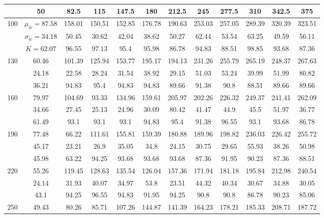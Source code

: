 \documentclass[10pt]{article}
\begin{document}
\begin{center}
\begin{tabular}{|c|c|c|c|c|c|c|c|c|c|c|c|}
\hline
 & 50 & 82.5 & 115 & 147.5 & 180 & 212.5 & 245 & 277.5 & 310 & 342.5 & 375 \\
\hline
\multirow{3}{*}{100} & $\mu_{w}=87.58$ & 158.01 & 150.51 & 152.85 & 176.78 & 190.63 & 253.03 & 257.05 & 289.39 & 320.39 & 323.51 \\
\hline
 & $\sigma_{w}=34.18$ & 50.45 & 30.62 & 42.04 & 38.62 & 50.27 & 62.44 & 53.54 & 63.25 & 49.59 & 56.11 \\
\hline
 & $K=62.07$ & 96.55 & 97.13 & 95.4 & 95.98 & 86.78 & 94.83 & 88.51 & 98.85 & 93.68 & 87.36 \\
\hline
\multirow{3}{*}{130} & 60.46 & 101.39 & 125.94 & 153.77 & 195.17 & 194.13 & 231.26 & 255.79 & 265.19 & 248.37 & 267.63 \\
\hline
 & 24.18 & 22.58 & 28.24 & 31.54 & 38.92 & 29.15 & 51.03 & 53.24 & 39.99 & 51.99 & 80.82 \\
\hline
 & 36.21 & 94.83 & 95.4 & 94.83 & 94.83 & 89.66 & 91.38 & 90.8 & 88.51 & 89.66 & 89.66 \\
\hline
\multirow{3}{*}{160} & 79.97 & 104.69 & 93.33 & 134.96 & 159.61 & 205.97 & 202.26 & 226.32 & 249.37 & 241.41 & 262.09 \\
\hline
 & 34.66 & 27.45 & 25.13 & 24.96 & 30.09 & 80.42 & 41.47 & 44.9 & 45.5 & 51.97 & 36.77 \\
\hline
 & 61.49 & 93.1 & 93.1 & 93.1 & 94.83 & 95.4 & 91.38 & 96.55 & 93.1 & 93.68 & 86.78 \\
\hline
\multirow{3}{*}{190} & 77.48 & 66.22 & 111.61 & 155.81 & 159.39 & 180.88 & 189.96 & 198.82 & 236.03 & 226.42 & 255.72 \\
\hline
 & 45.17 & 23.21 & 26.9 & 35.05 & 34.8 & 24.15 & 30.75 & 29.65 & 55.93 & 38.26 & 50.98 \\
\hline
 & 45.98 & 63.22 & 94.25 & 93.68 & 93.68 & 93.68 & 87.36 & 91.95 & 90.23 & 87.36 & 88.51 \\
\hline
\multirow{3}{*}{220} & 55.26 & 119.45 & 128.63 & 135.54 & 126.04 & 157.36 & 171.94 & 181.18 & 195.84 & 212.98 & 240.54 \\
\hline
 & 24.14 & 31.93 & 40.07 & 34.97 & 53.8 & 23.51 & 44.32 & 40.34 & 30.67 & 34.88 & 30.05 \\
\hline
 & 43.1 & 94.25 & 96.55 & 94.83 & 91.95 & 94.25 & 90.8 & 90.8 & 86.78 & 90.23 & 85.06 \\
\hline
\multirow{3}{*}{250} & 49.43 & 80.26 & 85.71 & 107.26 & 144.87 & 141.39 & 164.23 & 178.21 & 185.33 & 208.71 & 187.72 \\

\end{tabular}
\end{center}
\end{document}
